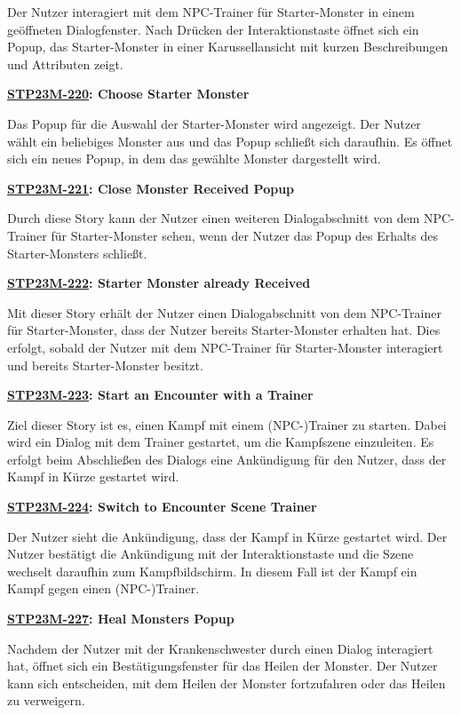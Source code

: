 Der Nutzer interagiert mit dem NPC-Trainer für Starter-Monster in einem geöffneten Dialogfenster. Nach Drücken der Interaktionstaste öffnet sich ein Popup, das Starter-Monster in einer Karussellansicht mit kurzen Beschreibungen und Attributen zeigt.

\textbf{\hyperlink{T220}{\hypertarget{S220}{STP23M-220}}: Choose Starter Monster}

Das Popup für die Auswahl der Starter-Monster wird angezeigt. Der Nutzer wählt ein beliebiges Monster aus und das Popup schließt sich daraufhin. Es öffnet sich ein neues Popup, in dem das gewählte Monster dargestellt wird.

\textbf{\hyperlink{T221}{\hypertarget{S221}{STP23M-221}}: Close Monster Received Popup}

Durch diese Story kann der Nutzer einen weiteren Dialogabschnitt von dem NPC-Trainer für Starter-Monster sehen, wenn der Nutzer das Popup des Erhalts des Starter-Monsters schließt. 

\textbf{\hyperlink{T222}{\hypertarget{S222}{STP23M-222}}: Starter Monster already Received}

Mit dieser Story erhält der Nutzer einen Dialogabschnitt von dem NPC-Trainer für Starter-Monster, dass der Nutzer bereits Starter-Monster erhalten hat. Dies erfolgt, sobald der Nutzer mit dem NPC-Trainer für Starter-Monster interagiert und bereits Starter-Monster besitzt.

\textbf{\hyperlink{T223}{\hypertarget{S223}{STP23M-223}}: Start an Encounter with a Trainer}

Ziel dieser Story ist es, einen Kampf mit einem (NPC-)Trainer zu starten. Dabei wird ein Dialog mit dem Trainer gestartet, um die Kampfszene einzuleiten. Es erfolgt beim Abschließen des Dialogs eine Ankündigung für den Nutzer, dass der Kampf in Kürze gestartet wird.

\textbf{\hyperlink{T224}{\hypertarget{S224}{STP23M-224}}: Switch to Encounter Scene Trainer}

Der Nutzer sieht die Ankündigung, dass der Kampf in Kürze gestartet wird. Der Nutzer bestätigt die Ankündigung mit der Interaktionstaste und die Szene wechselt daraufhin zum Kampfbildschirm. In diesem Fall ist der Kampf ein Kampf gegen einen (NPC-)Trainer.

\textbf{\hyperlink{T227}{\hypertarget{S227}{STP23M-227}}: Heal Monsters Popup}

Nachdem der Nutzer mit der Krankenschwester durch einen Dialog interagiert hat, öffnet sich ein Bestätigungsfenster für das Heilen der Monster. Der Nutzer kann sich entscheiden, mit dem Heilen der Monster fortzufahren oder das Heilen zu verweigern.

